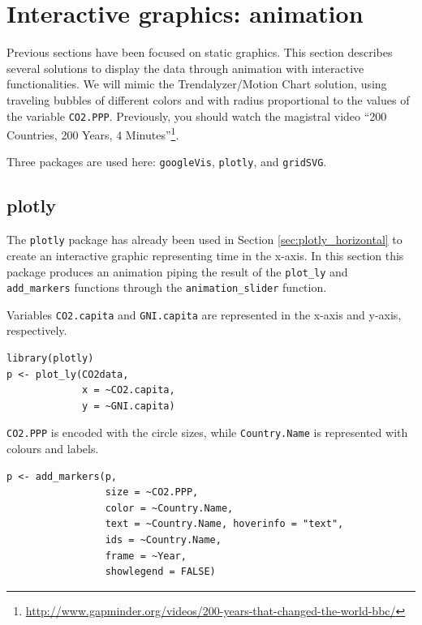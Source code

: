 \documentclass[smallroyalvopaper]{memoir}
\begin{document}
\section{Interactive graphics: animation \label{sec:timeseries_animation}}
\label{sec:org98d37a3}

Previous sections have been focused on static graphics. This section
describes several solutions to display the data through animation with
interactive functionalities. We will mimic the Trendalyzer/Motion
Chart solution, using traveling bubbles of different colors and with
radius proportional to the values of the variable
\texttt{CO2.PPP}. Previously, you should watch the magistral video ``200
Countries, 200 Years, 4 Minutes''\footnote{\url{http://www.gapminder.org/videos/200-years-that-changed-the-world-bbc/}}.

Three packages are used here: \texttt{googleVis}, \texttt{plotly}, and \texttt{gridSVG}.


\subsection{plotly \label{sec:plotly_animation}}
\label{sec:org881d768}
The \texttt{plotly} package has already been used in Section
\ref{sec:plotly_horizontal} to create an interactive graphic
representing time in the x-axis. In this section this package produces
an animation piping the result of the \texttt{plot\_ly} and \texttt{add\_markers}
functions through the \texttt{animation\_slider} function.


Variables \texttt{CO2.capita} and \texttt{GNI.capita} are represented in the x-axis
and y-axis, respectively.
\lstset{language=r,label= ,caption= ,captionpos=b,numbers=none}
\begin{lstlisting}
library(plotly)
p <- plot_ly(CO2data,
             x = ~CO2.capita,
             y = ~GNI.capita)
\end{lstlisting}

\texttt{CO2.PPP} is encoded with the circle sizes, while \texttt{Country.Name} is
represented with colours and labels.
\lstset{language=r,label= ,caption= ,captionpos=b,numbers=none}
\begin{lstlisting}
p <- add_markers(p,
                 size = ~CO2.PPP,
                 color = ~Country.Name,
                 text = ~Country.Name, hoverinfo = "text",
                 ids = ~Country.Name,
                 frame = ~Year,
                 showlegend = FALSE)
\end{lstlisting}
\end{document}
